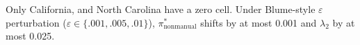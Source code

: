 


Only California, and North Carolina have a zero cell. Under Blume-style $\varepsilon$ perturbation ($\varepsilon \in \{.001,.005,.01\}$), $\pi^*_{\text{nonmanual}}$ shifts by at most 0.001 and $\lambda_2$ by at most 0.025.
